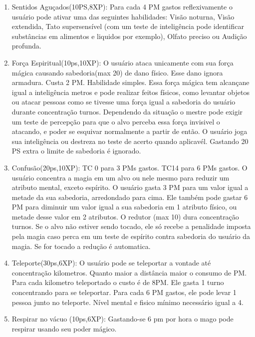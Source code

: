 \begin{enumerate}
  
  		 	\item Sentidos Aguçados(10PS,8XP): Para cada 4 PM gastos reflexivamente o usuário pode ativar uma das seguintes habilidades: Visão noturna, Visão extendida, Tato supersensível (com um teste de inteligência pode identificar substâncias em alimentos e liquidos por exemplo), Olfato preciso ou Audição profunda.


 	\item Força Espiritual(10ps,10XP): O usuário ataca unicamente com sua força mágica causando sabedoria(max 20) de dano físico. Esse dano ignora armadura. Custa 2 PM. Habilidade simples. Essa força mágica tem alcançane igual a inteligência metros e pode realizar feitos físicos, como levantar objetos ou atacar pessoas como se tivesse uma força igual a sabedoria do usuário durante concentração turnos. Dependendo da situação o mestre pode exigir um teste de percepção para que o alvo perceba essa força invisivel o atacando, e poder se esquivar normalmente a partir de então. O usuário joga sua inteligência ou destreza no teste de acerto quando aplicavél. Gastando 20 PS extra o limite de sabedoria é ignorado.  
  	
	\item Confusão(20ps,10XP): TC 0 para 3 PMs gastos. TC14 para 6 PMs gastos.\newline 
O usuário concentra a magia em um alvo ou nele mesmo para reduzir um atributo mental, exceto espírito. O usuário gasta 3 PM para um valor igual a metade da sua sabedoria, arredondado para cima. Ele também pode gastar 6 PM para diminuir um valor igual a sua sabedoria em 1 atributo físico, ou metade desse valor em 2 atributos. O redutor (max 10) dura concentração turnos. Se o alvo não estiver sendo tocado, ele só recebe a penalidade imposta pela magia caso perca em um teste de espírito contra sabedoria do usuário da magia. Se for tocado a redução é automatica.
  
	 	\item Teleporte(30ps,6XP): O usuário pode se teleportar a vontade até concentração kilometros. Quanto maior a distância maior o consumo de PM. Para cada kilometro teleportado o custo é de 8PM. Ele gasta 1 turno concentrando para se teleportar. Para cada 6 PM gastos, ele pode levar 1 pessoa junto no teleporte.  Nível mental e fisico mínimo necessário igual a 4.
  
	 	\item Respirar no vácuo (10ps,6XP): Gastando-se 6 pm por hora o mago pode respirar usando seu poder mágico. 


\end{enumerate}

